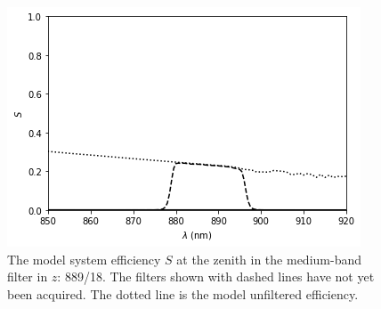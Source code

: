 \begin{figure}
\begin{center}
\includegraphics[width=0.7\linewidth]{figures/huitzi-f20-S-NBMB-z.png}
\medskip
\caption{The model system efficiency $S$ at the zenith in the medium-band filter in $z$: 889/18. The filters shown with dashed lines have not yet been acquired. The dotted line is the model unfiltered efficiency.}
\label{figure:huitzi-f20-S-last}
\end{center}
\end{figure}

